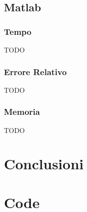 \documentclass[11pt,italian]{article}
\begin{document}
\subsection{Matlab}
\subsubsection*{Tempo}
TODO
\begin{figure}[H]
\end{figure}

\subsubsection*{Errore Relativo}
TODO
\begin{figure}[H]
\end{figure}

\subsubsection*{Memoria}
TODO
\begin{figure}[H]
\end{figure}

\newpage
\section{Conclusioni}

\newpage
\section{Code}
\end{document}
